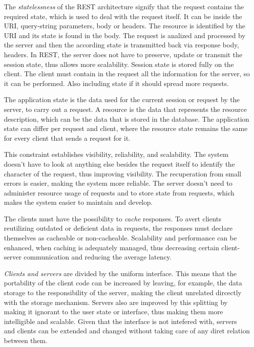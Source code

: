 The \textit{statelessness} of the REST architecture signify that the request contains the required state, which is used to deal with the request itself.
It can be inside the URI, query-string parameters, body or headers. The resource is identified by the URI and its state is found in the body. The request is analized and processed by the server and then the according state is transmitted back via response body, headers.
In REST, the server does not have to preserve, update or transmit the session state, thus allows more scalability. Session state is stored fully on the client. The client must contain in the request all the information for the server, so it can be performed. Also including state if it should spread more requests.

The application state is the data used for the current session or request by the server, to carry out a request. A resource is the data that represents the resource description, which can be the data that is stored in the database. The application state can differ per request and client, where the resource state remains the same for every client that sends a request for it.

This constraint establishes visibility, reliability, and scalability. The system doesn't have to look at anything else besides the request itself to identify the character of the request, thus improving visibility. The recuperation from small errors is easier, making the system more reliable. The server doesn't need to administer resource usage of requests and to store state from requests, which makes the system easier to maintain and develop.

The clients must have the possibility to \textit{cache} responses. To avert clients reutilizing outdated or deficient data in requests, the responses must declare themselves as cacheable or non-cacheable. Scalability and performance can be enhanced, when caching is adequately managed, thus decreasing certain client-server communication and reducing the average latency. 

\textit{Clients and servers} are divided by the uniform interface. This means that the portability of the client code can be increased by leaving, for example, the data storage to the responsibility of the server, making the client unrelated dircectly with the storage mechanism. Servers also are improved by this splitting by making it ignorant to the user state or interface, thus making them more intelligible and scalable. Given that the interface is not intefered with, servers and clients can be extended and changed without taking care of any diret relation between them.

